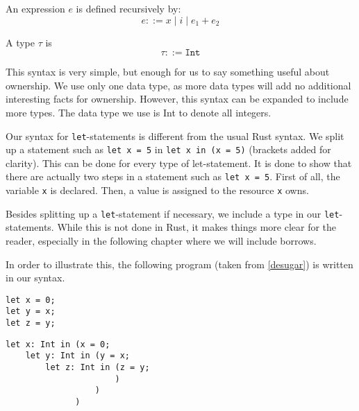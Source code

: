 \begin{definition}
\label{expressionsmove}
An expression $e$ is defined recursively by:
$$e ::= x \mid i \mid e_1 + e_2$$
\end{definition}

\begin{definition}
\label{typesmove}
A type $\tau$ is
$$\tau ::= \texttt{Int}$$
\end{definition}

This syntax is very simple, but enough for us to say something useful about ownership. We use only one data type, as more data types will add no additional interesting facts for ownership. However, this syntax can be expanded to include more types. The data type we use is Int to denote all integers.

Our syntax for \texttt{let}-statements is different from the usual Rust syntax. We split up a statement such as \verb|let x = 5| in \texttt{let x in (x = 5)} (brackets added for clarity). This can be done for every type of let-statement. It is done to show that there are actually two steps in a statement such as \texttt{let x = 5}. First of all, the variable \verb|x| is declared. Then, a value is assigned to the resource \verb|x| owns. 

Besides splitting up a \texttt{let}-statement if necessary, we include a type in our \texttt{let}-statements. While this is not done in Rust, it makes things more clear for the reader, especially in the following chapter where we will include borrows. 

In order to illustrate this, the following program (taken from \ref{desugar}) is written in our syntax. 

\begin{verbatim}
let x = 0;
let y = x;
let z = y;
\end{verbatim}

\begin{verbatim}
let x: Int in (x = 0;
    let y: Int in (y = x;
        let z: Int in (z = y;
                      )
                  )
              )
\end{verbatim}

